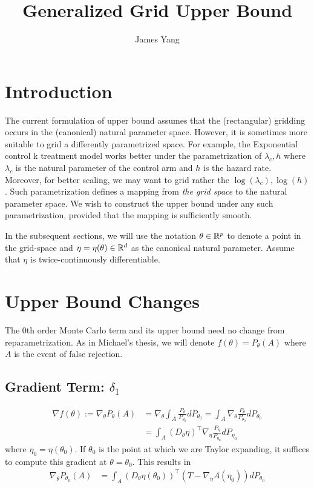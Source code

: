 \documentclass[10pt, a4paper]{article}
\begin{document}
\title{Generalized Grid Upper Bound}
\author{James Yang}
\maketitle

\section*{Introduction}

The current formulation of upper bound assumes that the 
(rectangular) gridding occurs in the (canonical) natural parameter space.
However, it is sometimes more suitable to grid 
a differently parametrized space.
For example, the Exponential control k treatment model
works better under the parametrization of $\lambda_{c}, h$
where $\lambda_c$ is the natural parameter of the control arm
and $h$ is the hazard rate.
Moreover, for better scaling, we may want to grid 
rather the $\log(\lambda_{c}), \log(h)$.
Such parametrization defines a mapping from 
\emph{the grid space} to the natural parameter space.
We wish to construct the upper bound under any such parametrization,
provided that the mapping is sufficiently smooth.

In the subsequent sections,
we will use the notation $\theta \in \mathbb{R}^p$ to denote 
a point in the grid-space and $\eta = \eta(\theta) \in \mathbb{R}^d$
as the canonical natural parameter.
Assume that $\eta$ is twice-continuously differentiable.

\section*{Upper Bound Changes}

The 0th order Monte Carlo term and its upper bound
need no change from reparametrization.
As in Michael's thesis, we will denote $f(\theta) = P_\theta(A)$
where $A$ is the event of false rejection.

\subsection*{Gradient Term: $\delta_1$}

\begin{align*}
    \nabla f(\theta)
    :=
    \nabla_{\theta} P_\theta(A) 
    &=
    \nabla_{\theta} \int_A \frac{P_{\theta}}{P_{\theta_0}} dP_{\theta_0}
    =
    \int_A \nabla_{\theta} \frac{P_{\theta}}{P_{\theta_0}} dP_{\theta_0}
    \\&=
    \int_A (D_{\theta}\eta)^\top 
    \nabla_{\eta} \frac{P_{\eta}}{P_{\eta_0}} dP_{\eta_0}
\end{align*}
where $\eta_0 = \eta(\theta_0)$.
If $\theta_0$ is the point at which we are Taylor expanding,
it suffices to compute this gradient at $\theta = \theta_0$.
This results in
\begin{align*}
    \nabla_{\theta} P_{\theta_0}(A) 
    &=
    \int_A (D_{\theta}\eta(\theta_0))^\top (T - \nabla_\eta A(\eta_0)) dP_{\theta_0}
\end{align*}
\end{document}
